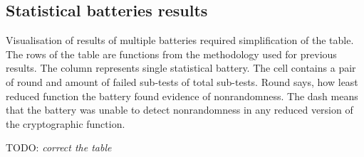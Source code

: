 \documentclass[
  print, %
  Table,   %
  nolof,     %
  nolot,     %
  11pt, %
  oneside  %
]{fithesis3}
\newcommand{\todo}[1]{TODO: \textit{#1}}
\begin{document}
\subsection{Statistical batteries results}
\label{subsec:relatwork-stat-res}

Visualisation of results of multiple batteries required simplification of the table. The rows of the table are functions from the methodology used for previous results. The column represents single statistical battery. The cell contains a pair of round and amount of failed sub-tests of total sub-tests. Round says, how least reduced function the battery found evidence of nonrandomness. The dash means that the battery was unable to detect nonrandomness in any reduced version of the cryptographic function.

\todo{correct the table}
\end{document}
